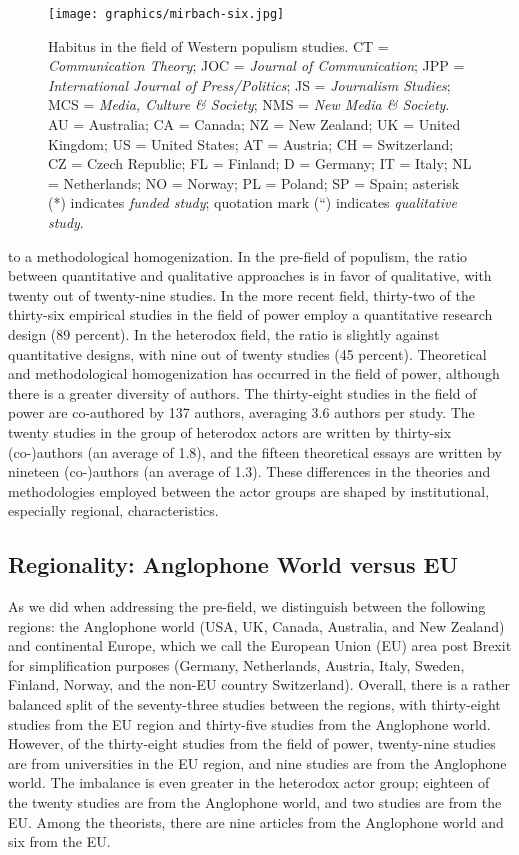 \documentclass{tufte-handout}
\begin{document}
{{\begin{figure}
    \centering
    \texttt{[image: graphics/mirbach-six.jpg]}
    \caption{Habitus in the field of Western populism studies. CT =
\emph{Communication Theory}; JOC = \emph{Journal of Communication}; JPP
= \emph{International Journal of Press/Politics}; JS = \emph{Journalism
Studies}; MCS = \emph{Media, Culture \& Society}; NMS = \emph{New Media
\& Society}. AU = Australia; CA = Canada; NZ = New Zealand; UK = United
Kingdom; US = United States; AT = Austria; CH = Switzerland; CZ = Czech
Republic; FL = Finland; D = Germany; IT = Italy; NL = Netherlands; NO =
Norway; PL = Poland; SP = Spain; asterisk (*) indicates \emph{funded
study}; quotation mark (``) indicates \emph{qualitative study}.}
    \label{fig:6}
\end{figure}


\noindent to a methodological
homogenization. In the pre-field of populism, the ratio between
quantitative and qualitative approaches is in favor of qualitative, with
twenty out of twenty-nine studies. In the more recent field, thirty-two
of the thirty-six empirical studies in the field of power employ a
quantitative research design (89 percent). In the heterodox field, the ratio is
slightly against quantitative designs, with nine out of twenty studies
(45 percent). Theoretical and methodological homogenization has occurred
in the field of power, although there is a greater diversity of authors.
The thirty-eight studies in the field of power are co-authored by 137
authors, averaging 3.6 authors per study. The twenty studies in the
group of heterodox actors are written by thirty-six (co-)authors (an
average of 1.8), and the fifteen theoretical essays are written by
nineteen (co-)authors (an average of 1.3). These differences in the
theories and methodologies employed between the actor groups are shaped
by institutional, especially regional, characteristics.

\hypertarget{regionality-anglophone-world-versus-eu}{%
\subsection{Regionality: Anglophone World
versus
EU}\label{regionality-anglophone-world-versus-eu}}

As we did when addressing the pre-field, we distinguish between the
following regions: the Anglophone world (USA, UK, Canada, Australia, and
New Zealand) and continental Europe, which we call the European Union
(EU) area post Brexit for simplification purposes (Germany, Netherlands,
Austria, Italy, Sweden, Finland, Norway, and the non-EU country
Switzerland). Overall, there is a rather balanced split of the
seventy-three studies between the regions, with thirty-eight studies
from the EU region and thirty-five studies from the Anglophone world.
However, of the thirty-eight studies from the field of power,
twenty-nine studies are from universities in the EU region, and nine
studies are from the Anglophone world. The imbalance is even greater in
the heterodox actor group; eighteen of the twenty studies are from the
Anglophone world, and two studies are from the EU. Among the theorists,
there are nine articles from the Anglophone world and six from the EU.

}}
\end{document}
